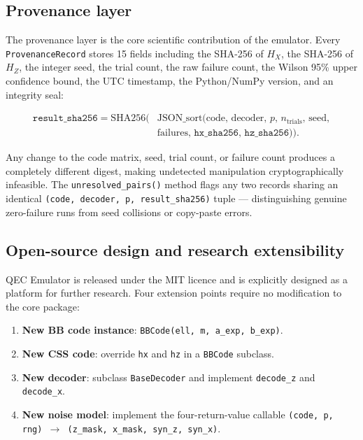 \documentclass[11pt,a4paper]{article}
\begin{document}
\subsection{Provenance layer}

The provenance layer is the core scientific contribution of the emulator.
Every \texttt{ProvenanceRecord} stores 15 fields including the SHA-256 of
$H_X$, the SHA-256 of $H_Z$, the integer seed, the trial count, the raw
failure count, the Wilson 95\% upper confidence bound, the UTC timestamp,
the Python/NumPy version, and an integrity seal:

\begin{equation}
\begin{split}
  \texttt{result\_sha256}
  = \mathrm{SHA256}\!\bigl(&
    \mathrm{JSON\_sort}(\mathrm{code},\, \mathrm{decoder},\, p,\,
    n_{\mathrm{trials}},\, \mathrm{seed},\\
    &\mathrm{failures},\,
    \texttt{hx\_sha256},\, \texttt{hz\_sha256})
  \bigr).
\end{split}
  \label{eq:integrity-seal}
\end{equation}

Any change to the code matrix, seed, trial count, or failure count
produces a completely different digest, making undetected manipulation
cryptographically infeasible.
The \texttt{unresolved\_pairs()} method flags any two records sharing
an identical \texttt{(code, decoder, p, result\_sha256)} tuple ---
distinguishing genuine zero-failure runs from seed collisions or
copy-paste errors.

\subsection{Open-source design and research extensibility}

QEC Emulator is released under the MIT licence and is explicitly
designed as a platform for further research.
Four extension points require no modification to the core package:

\begin{enumerate}[leftmargin=1.6em]
  \item \textbf{New BB code instance}: \texttt{BBCode(ell, m, a\_exp, b\_exp)}.
  \item \textbf{New CSS code}: override \texttt{hx} and \texttt{hz} in
    a \texttt{BBCode} subclass.
  \item \textbf{New decoder}: subclass \texttt{BaseDecoder} and implement
    \texttt{decode\_z} and \texttt{decode\_x}.
  \item \textbf{New noise model}: implement the four-return-value callable
    \texttt{(code, p, rng) $\to$ (z\_mask, x\_mask, syn\_z, syn\_x)}.
\end{enumerate}
\end{document}
